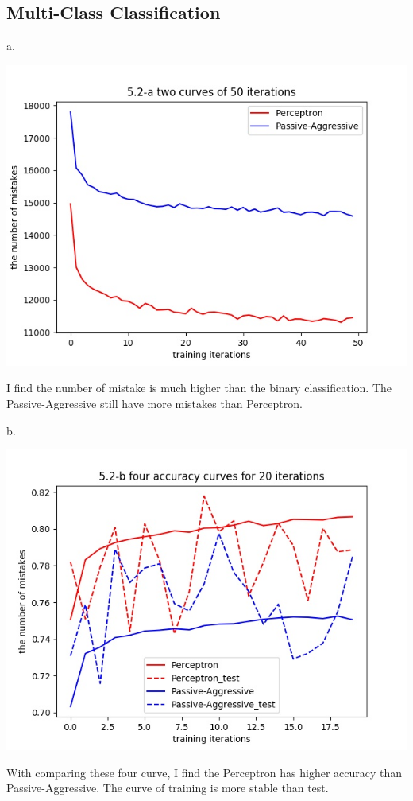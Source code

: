 \documentclass[12pt]{article}
\begin{document}
		\subsection {Multi-Class Classification}
			\par a.	\par\includegraphics[height=10cm] {part2_a}
			\par I find the number of mistake is much higher than the binary classification. The Passive-Aggressive still have more mistakes than Perceptron. 
			\par b.	\par\includegraphics[height=10cm] {part2_b}
			\par With comparing these four curve, I find the Perceptron has higher accuracy than Passive-Aggressive. The curve of training is more stable than test.
\end{document}
